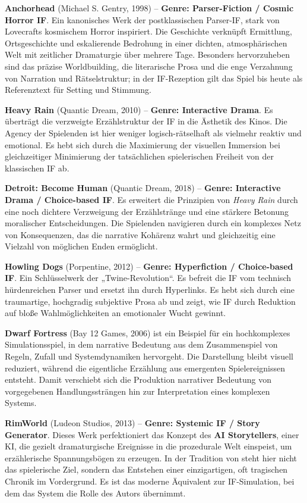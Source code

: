 \documentclass[parskip=half,a4paper,11pt]{scrreprt}
\begin{document}
\textbf{Anchorhead} (Michael S. Gentry, 1998) – \textbf{Genre: Parser-Fiction / Cosmic Horror IF}. Ein kanonisches Werk der postklassischen Parser-IF, stark von Lovecrafts kosmischem Horror inspiriert. Die Geschichte verknüpft Ermittlung, Ortsgeschichte und eskalierende Bedrohung in einer dichten, atmosphärischen Welt mit zeitlicher Dramaturgie über mehrere Tage. Besonders hervorzuheben sind das präzise Worldbuilding, die literarische Prosa und die enge Verzahnung von Narration und Rätselstruktur; in der IF-Rezeption gilt das Spiel bis heute als Referenztext für Setting und Stimmung.

\textbf{Heavy Rain} (Quantic Dream, 2010) – \textbf{Genre: Interactive Drama}. Es überträgt die verzweigte Erzählstruktur der IF in die Ästhetik des Kinos. Die Agency der Spielenden ist hier weniger logisch-rätselhaft als vielmehr reaktiv und emotional. Es hebt sich durch die Maximierung der visuellen Immersion bei gleichzeitiger Minimierung der tatsächlichen spielerischen Freiheit von der klassischen IF ab.

\textbf{Detroit: Become Human} (Quantic Dream, 2018) – \textbf{Genre: Interactive Drama / Choice-based IF}. Es erweitert die Prinzipien von \textit{Heavy Rain} durch eine noch dichtere Verzweigung der Erzählstränge und eine stärkere Betonung moralischer Entscheidungen. Die Spielenden navigieren durch ein komplexes Netz von Konsequenzen, das die narrative Kohärenz wahrt und gleichzeitig eine Vielzahl von möglichen Enden ermöglicht.

\textbf{Howling Dogs} (Porpentine, 2012) – \textbf{Genre: Hyperfiction / Choice-based IF}. Ein Schlüsselwerk der „Twine-Revolution“. Es befreit die IF vom technisch hürdenreichen Parser und ersetzt ihn durch Hyperlinks. Es hebt sich durch eine traumartige, hochgradig subjektive Prosa ab und zeigt, wie IF durch Reduktion auf bloße Wahlmöglichkeiten an emotionaler Wucht gewinnt.

\textbf{Dwarf Fortress} (Bay 12 Games, 2006) ist ein Beispiel für ein hochkomplexes Simulationsspiel, in dem narrative Bedeutung aus dem Zusammenspiel von Regeln, Zufall und Systemdynamiken hervorgeht. Die Darstellung bleibt visuell reduziert, während die eigentliche Erzählung aus emergenten Spielereignissen entsteht. Damit verschiebt sich die Produktion narrativer Bedeutung von vorgegebenen Handlungssträngen hin zur Interpretation eines komplexen Systems.

\textbf{RimWorld} (Ludeon Studios, 2013) – \textbf{Genre: Systemic IF / Story Generator}. Dieses Werk perfektioniert das Konzept des \textbf{AI Storytellers}, einer KI, die gezielt dramaturgische Ereignisse in die prozedurale Welt einspeist, um erzählerische Spannungsbögen zu erzeugen. In der Tradition von \citet{Salen2004} steht hier nicht das spielerische Ziel, sondern das Entstehen einer einzigartigen, oft tragischen Chronik im Vordergrund. Es ist das moderne Äquivalent zur IF-Simulation, bei dem das System die Rolle des Autors übernimmt.
\end{document}
